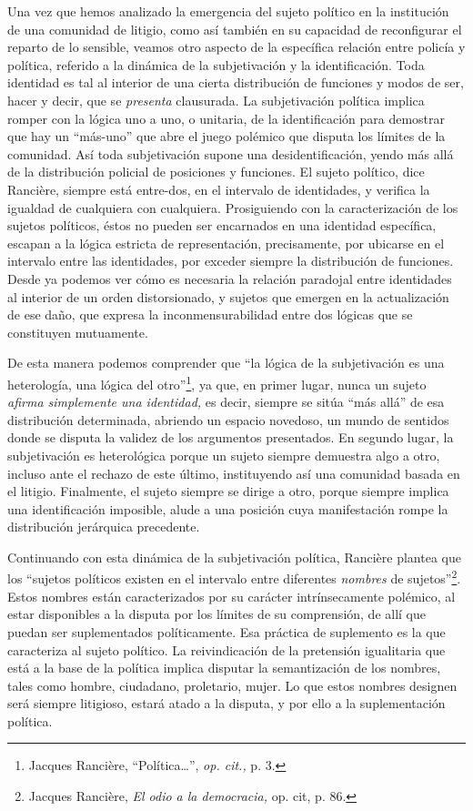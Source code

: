Una vez que hemos analizado la emergencia del sujeto político en la institución de una comunidad de litigio, como así también en su capacidad de reconfigurar el reparto de lo sensible, veamos otro aspecto de la específica relación entre policía y política, referido a la dinámica de la subjetivación y la identificación. Toda identidad es tal al interior de una cierta distribución de funciones y modos de ser, hacer y decir, que se \emph{presenta} clausurada. La subjetivación política implica romper con la lógica uno a uno, o unitaria, de la identificación para demostrar que hay un \enquote{más-uno} que abre el juego polémico que disputa los límites de la comunidad. Así toda subjetivación supone una desidentificación, yendo más allá de la distribución policial de posiciones y funciones. El sujeto político, dice Rancière, siempre está entre-dos, en el intervalo de identidades, y verifica la igualdad de cualquiera con cualquiera. Prosiguiendo con la caracterización de los sujetos políticos, éstos no pueden ser encarnados en una identidad específica, escapan a la lógica estricta de representación, precisamente, por ubicarse en el intervalo entre las identidades, por exceder siempre la distribución de funciones. Desde ya podemos ver cómo es necesaria la relación paradojal entre identidades al interior de un orden distorsionado, y sujetos que emergen en la actualización de ese daño, que expresa la inconmensurabilidad entre dos lógicas que se constituyen mutuamente.

De esta manera podemos comprender que \enquote{la lógica de la subjetivación es una heterología, una lógica del otro}\footnote{Jacques Rancière, \enquote{Política\ldots}, \emph{op. cit.,} p. 3.}, ya que, en primer lugar, nunca un sujeto \emph{afirma simplemente una identidad,} es decir, siempre se sitúa \enquote{más allá} de esa distribución determinada, abriendo un espacio novedoso, un mundo de sentidos donde se disputa la validez de los argumentos presentados. En segundo lugar, la subjetivación es heterológica porque un sujeto siempre demuestra algo a otro, incluso ante el rechazo de este último, instituyendo así una comunidad basada en el litigio. Finalmente, el sujeto siempre se dirige a otro, porque siempre implica una identificación imposible, alude a una posición cuya manifestación rompe la distribución jerárquica precedente.

Continuando con esta dinámica de la subjetivación política, Rancière plantea que los \enquote{sujetos políticos existen en el intervalo entre diferentes \emph{nombres} de sujetos}\footnote{Jacques Rancière, \emph{El odio a la democracia,} op. cit, p. 86.}. Estos nombres están caracterizados por su carácter intrínsecamente polémico, al estar disponibles a la disputa por los límites de su comprensión, de allí que puedan ser suplementados políticamente. Esa práctica de suplemento es la que caracteriza al sujeto político. La reivindicación de la pretensión igualitaria que está a la base de la política implica disputar la semantización de los nombres, tales como hombre, ciudadano, proletario, mujer. Lo que estos nombres designen será siempre litigioso, estará atado a la disputa, y por ello a la suplementación política.

